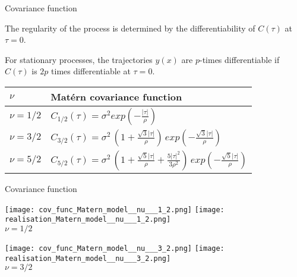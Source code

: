 \documentclass[9pt]{beamer}
\newcommand{\absolute}[1]{| #1 |}
\begin{document}
\begin{frame}[t]{Covariance function}

The regularity of the process is determined by the differentiability of $C(\tau)$ at $\tau = 0$.

For stationary processes, the trajectories $y(x)$ are $p$-times differentiable if $C(\tau)$ is $2p$ times differentiable at $\tau = 0$.



\begin{center}
\begin{tabular}{ll}
  \hline
  $\nu$ & Mat\'{e}rn covariance function \\
  \hline
   $\nu = 1/2 $ & $C_{1/2}(\tau) = \sigma^2 exp( - \frac{\absolute{\tau}}{\rho} )$ \\
   $\nu = 3/2 $ &   $C_{3/2}(\tau) = \sigma^2 \, (1+ \frac{\sqrt{3}\absolute{\tau}}{\rho}) \, exp( - \frac{\sqrt{3}\absolute{\tau}}{\rho} )$\\
   $\nu = 5/2 $ &  $C_{5/2}(\tau) = \sigma^2 \, (1+ \frac{\sqrt{5}\absolute{\tau}}{\rho} + \frac{5 {\absolute{\tau}}^2 }{3 \rho^2} ) \, exp( - \frac{\sqrt{5}\absolute{\tau}}{\rho} )$ \\
  \hline
\end{tabular}
\end{center}

\end{frame}

\begin{frame}[t]{Covariance function}

\begin{center}
\texttt{[image: cov\_func\_Matern\_model\_\_nu\_\_\_1\_2.png]} 
\texttt{[image: realisation\_Matern\_model\_\_nu\_\_\_1\_2.png]} \\

$\nu = 1/2$
\end{center}

\begin{center}
\texttt{[image: cov\_func\_Matern\_model\_\_nu\_\_\_3\_2.png]} 
\texttt{[image: realisation\_Matern\_model\_\_nu\_\_\_3\_2.png]} \\

$\nu = 3/2$

\end{center}

\end{frame}
\end{document}

